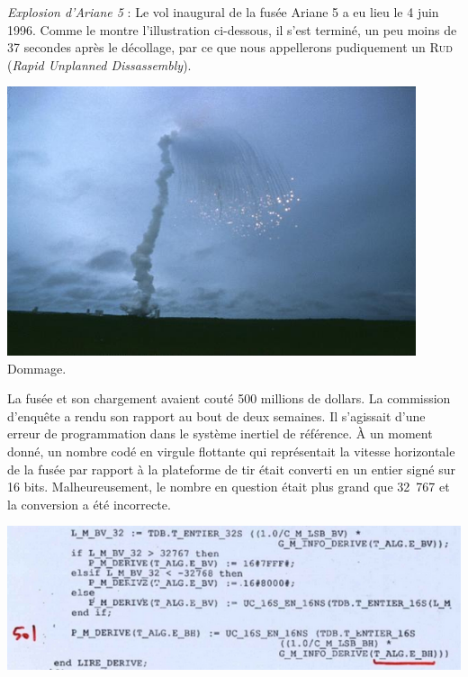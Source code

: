 \documentclass{magnoliaold}
\begin{document}
\begin{remarques}
  \remarque \emph{Explosion d'Ariane 5} :
  Le vol inaugural de la fusée Ariane 5 a eu lieu le 4 juin 1996.
  Comme le montre l'illustration ci-dessous, il s'est terminé, un peu
  moins de 37 secondes après le décollage, par ce que nous appellerons
  pudiquement un \textsc{Rud} (\emph{Rapid Unplanned Dissassembly}).
  \begin{center}
    \includegraphics[width = 12cm]{../../commun/images/info-cours-memoire-explosion_ariane}\\
    Dommage.
  \end{center}
  \vspace{1ex}
  La fusée et son chargement avaient couté 500
  millions de dollars. La commission d'enquête a rendu son rapport au bout de
  deux semaines. Il s'agissait d'une erreur de programmation dans le système
  inertiel de référence. À un moment donné, un nombre codé en virgule flottante
  qui représentait la vitesse horizontale de la fusée par rapport à la
  plateforme de tir était converti en un entier signé sur 16 bits. Malheureusement, le
  nombre en question était plus grand que 32\ 767 et la conversion a été incorrecte.
  \vspace{1ex}
  \begin{center}
    \includegraphics[width = 14cm]{../../commun/images/info-cours-memoire-code_ariane}\\

\end{center}
\end{remarques}
\end{document}
